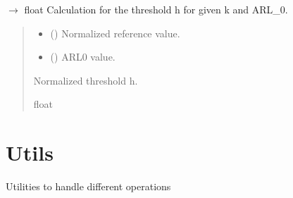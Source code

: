 \documentclass[letterpaper,10pt,oneside,english]{sphinxmanual}
\begin{document}
\begin{fulllineitems}
\label{\detokenize{ref_theoretical:package.ARLTheoretical.get_threshold_h}}
\pysigstartsignatures
\pysiglinewithargsret
{}
{\sphinxparamcomma {}}
{{ $\rightarrow$ float}}
\pysigstopsignatures
\sphinxAtStartPar
Calculation for the threshold h for given k and ARL\_0.
\begin{quote}\begin{description}
\begin{itemize}
\item {} 
\sphinxAtStartPar
{} () \textendash{} Normalized reference value.

\item {} 
\sphinxAtStartPar
{} () \textendash{} ARL0 value.

\end{itemize}

\sphinxAtStartPar
Normalized threshold h.

\sphinxAtStartPar
float

\end{description}\end{quote}

\end{fulllineitems}


\sphinxstepscope


\section{Utils}
\label{\detokenize{ref_utils:module-package.utils}}\label{\detokenize{ref_utils:utils}}\label{\detokenize{ref_utils::doc}}
\sphinxAtStartPar
Utilities to handle different operations
\end{document}
